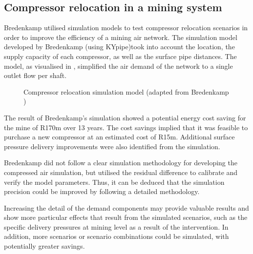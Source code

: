 \subsection{Compressor relocation in a mining system}
 Bredenkamp \cite{Bredenkamp2013Masters} utilised simulation models to test compressor relocation scenarios in order to improve the efficiency of a mining air network.  The simulation model developed by Bredenkamp (using KYpipe)took into account the location, the supply capacity of each compressor, as well as the surface pipe distances. The model, as visualised in , simplified the air demand of the network to a single outlet flow per shaft.
\par
\clearpage
\begin{figure}[!htbp]
	\centering
	\caption[Compressor relocation simulation model]{Compressor relocation simulation model (adapted from Bredenkamp \cite{Bredenkamp2013Masters})}
	\label{fig: bredenkamp model}
\end{figure}
The result of Bredenkamp's simulation showed a potential energy cost saving for the mine of R170m over 13 years. The cost savings implied that it was feasible to purchase a new compressor at an estimated cost of R15m. Additional surface pressure delivery improvements were also identified from the simulation.
\par 
Bredenkamp did not follow a clear simulation methodology for developing the compressed air simulation, but utilised the residual difference to calibrate and verify the model parameters. Thus, it can be deduced that the simulation precision could be improved by following a detailed methodology.
\par 
Increasing the detail of the demand components may provide valuable results and show more particular effects that result from the simulated scenarios, such as the specific delivery pressures at mining level as a result of the intervention. In addition, more scenarios or scenario combinations could be simulated, with potentially greater savings.

